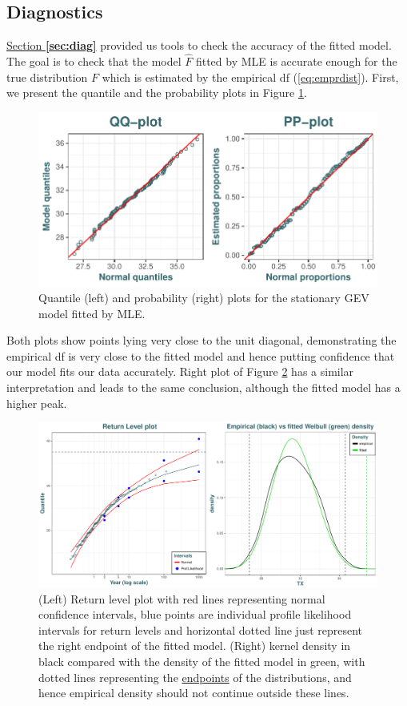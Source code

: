 \subsection{Diagnostics}

\hyperref[sec:diag]{Section \textbf{\ref{sec:diag}}} provided us tools to check the accuracy of the fitted model. The goal is to check that the
model $\hat{F}$ fitted by MLE is accurate enough for the true distribution $F$ which is estimated by the empirical df
(\ref{eq:emprdist}). First, we present the quantile and the probability plots in Figure \ref{fig:ppqqplot}.

\begin{figure}[!htb]
	\centering	\includegraphics[width=.7\linewidth]{pp_qqplot.pdf}\caption{Quantile (left) and probability (right) plots for the stationary GEV model fitted by MLE.}\label{fig:ppqqplot}
\end{figure}

Both plots show points lying very close to the unit diagonal, demonstrating the empirical df is very close to the fitted model and hence putting confidence that our model fits our data accurately.
Right plot of Figure \ref{fig:rl_empdes} has a similar interpretation and leads to the same conclusion, although the fitted model has a higher peak.

\begin{figure}[!htb]
	\centering	\includegraphics[width=.75\linewidth]{rl_empdes.pdf}\caption{(Left) Return level plot with red lines representing normal confidence intervals, blue points are individual profile likelihood intervals for return levels and horizontal dotted line just represent the right endpoint of the	fitted model. (Right) kernel density in black compared with the density of the fitted model in green, with dotted lines representing the \underline{endpoints} of the distributions, and hence empirical density should not continue outside these lines.}\label{fig:rl_empdes}
\end{figure}


